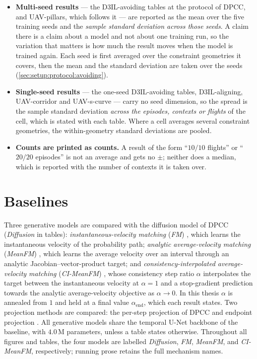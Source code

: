 \begin{itemize}
  \item \textbf{Multi-seed results} --- the D3IL-avoiding tables at the protocol of \ac{DPCC}, and
    UAV-pillars, which follows it --- are reported as the mean over the
    five training seeds and the \emph{sample standard deviation across those seeds}. A claim there is a
    claim about a model and not about one training run, so the variation that matters is how much the
    result moves when the model is trained again. Each seed is first averaged over the constraint geometries it covers,
    then the mean and the standard deviation are taken over the seeds
    (\autoref{sec:setup:protocol:avoiding}).
  \item \textbf{Single-seed results} --- the one-seed D3IL-avoiding tables, D3IL-aligning, UAV-corridor and
    UAV-s-curve --- carry no seed dimension, so the spread is the sample standard deviation
    \emph{across the episodes, contexts or flights} of the cell, which is stated with each table. Where a
    cell averages several constraint geometries, the within-geometry standard deviations are pooled.
  \item \textbf{Counts are printed as counts.} A result of the form \enquote{$10/10$ flights} or
    \enquote{$20/20$ episodes} is not an average and gets no $\pm$; neither does a median, which is
    reported with the number of contexts it is taken over.
\end{itemize}

\section{Baselines}\label{sec:setup:baselines}

Three generative models are compared with the diffusion model of \ac{DPCC} (\emph{Diffusion} in tables):
\emph{instantaneous-velocity matching} (\emph{FM}) \parencite{lipman2023flow}, which learns the
instantaneous velocity of the probability path; \emph{analytic average-velocity matching}
(\emph{MeanFM}) \parencite{geng2025meanflow}, which learns the average velocity over an interval through
an analytic Jacobian--vector-product target; and \emph{consistency-interpolated average-velocity
matching} (\emph{CI-MeanFM}) \parencite{zhang2025alphaflow}, whose consistency step ratio $\alpha$
interpolates the target between the instantaneous velocity at $\alpha=1$ and a stop-gradient prediction
towards the analytic average-velocity objective as $\alpha\to0$. In this thesis $\alpha$ is annealed from
$1$ and held at a final value
$\alpha_{\mathrm{end}}$, which each result states. Two projection methods are compared: the per-step projection of
\ac{DPCC} and endpoint projection \parencite{li2025hardflow}. All generative models share the temporal
U-Net backbone of the baseline, with $4.0$\,M parameters, unless a table states otherwise. Throughout
all figures and tables, the four models are labelled \emph{Diffusion}, \emph{FM}, \emph{MeanFM}, and
\emph{CI-MeanFM}, respectively; running prose retains the full mechanism names.

